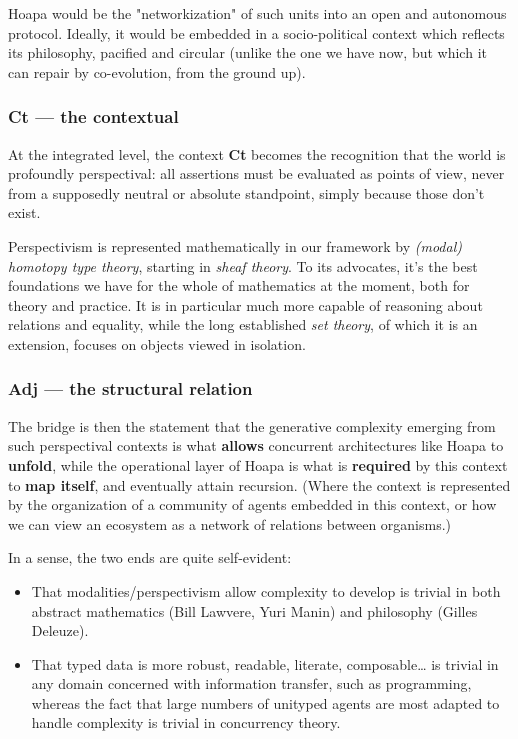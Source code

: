 \documentclass[11pt]{article}
\begin{document}
Hoapa would be the "networkization" of such units into an open and autonomous protocol. Ideally, it would be embedded in a socio-political context which reflects its philosophy, pacified and circular (unlike the one we have now, but which it can repair by co-evolution, from the ground up).

\subsubsection{Ct --- the contextual}

At the integrated level, the context \textbf{Ct} becomes the recognition that the world is profoundly perspectival: all assertions must be evaluated as points of view, never from a supposedly neutral or absolute standpoint, simply because those don't exist.

Perspectivism is represented mathematically in our framework by \emph{(modal) homotopy type theory}, starting in \emph{sheaf theory}. To its advocates, it's the best foundations we have for the whole of mathematics at the moment, both for theory and practice. It is in particular much more capable of reasoning about relations and equality, while the long established \emph{set theory}, of which it is an extension, focuses on objects viewed in isolation.

\subsubsection{Adj --- the structural relation}

The bridge is then the statement that the generative complexity emerging from such perspectival contexts is what \textbf{allows} concurrent architectures like Hoapa to \textbf{unfold}, while the operational layer of Hoapa is what is \textbf{required} by this context to \textbf{map itself}, and eventually attain recursion. (Where the context is represented by the organization of a community of agents embedded in this context, or how we can view an ecosystem as a network of relations between organisms.)

In a sense, the two ends are quite self-evident:

\begin{itemize}

\item That modalities/perspectivism allow complexity to develop is trivial in both abstract mathematics (Bill Lawvere, Yuri Manin) and philosophy (Gilles Deleuze).

\item That typed data is more robust, readable, literate, composable\ldots{} is trivial in any domain concerned with information transfer, such as programming, whereas the fact that large numbers of unityped agents are most adapted to handle complexity is trivial in concurrency theory.

\end{itemize}
\end{document}
